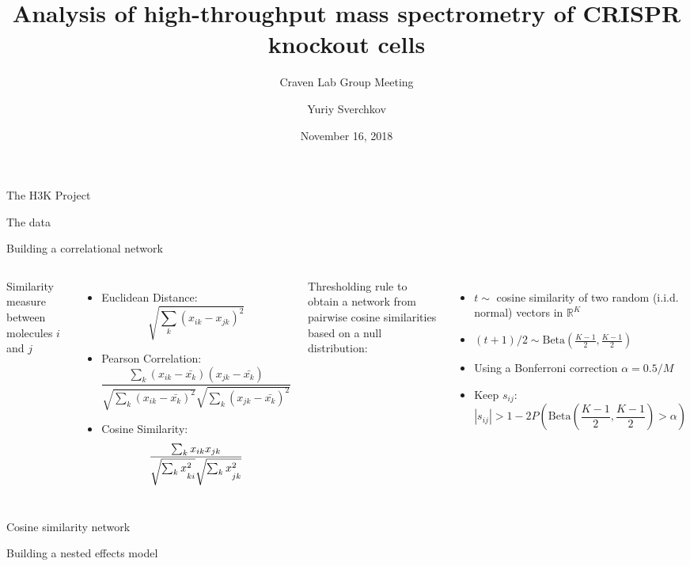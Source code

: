 \documentclass[aspectratio=169]{beamer}
\title{Analysis of high-throughput mass spectrometry of CRISPR knockout cells}
\subtitle{Craven Lab Group Meeting}
\author{Yuriy Sverchkov}
\institute{University of Wisconsin--Madison}
\date{November 16, 2018}
\begin{document}
  {
    \begin{frame}[plain]
      \titlepage
    \end{frame}
  }


\begin{frame}{The H3K Project}
\end{frame}


\begin{frame}{The data}
\end{frame}


\begin{frame}{Building a correlational network}
\begin{columns}
	 \small
	Similarity measure between molecules $i$ and $j$
	\begin{itemize}
		\item Euclidean Distance:
		\[
		\sqrt{ \sum_{k} (x_{ik} - x_{jk})^2 }
		\]\pause
		\item Pearson Correlation:
		\[
		\frac{\sum_k ( x_{ik} - \bar{x_k} ) ( x_{jk} - \bar{ x_k } ) }{ \sqrt{ \sum_k ( x_{ik} - \bar{x_k} )^2 } \sqrt{ \sum_k ( x_{jk} - \bar{ x_k } )^2 } }
		\]\pause
		\item Cosine Similarity:
		\[
		\frac{\sum_k x_{ik} x_{jk}}{ \sqrt{ \sum_k x_{ki\strut}^2 } \sqrt{ \sum_k x_{jk\strut}^2 } }
		\]\pause
	\end{itemize}
	 \small
	Thresholding rule to obtain a network from pairwise cosine similarities based on a null distribution:
	\pause
	
	\begin{itemize}
	\item $t \sim$ cosine similarity of two random (i.i.d. normal) vectors in $\mathbb R^K$
	\item $(t + 1)/2 \sim \mathrm{Beta}( \frac{K - 1}{2}, \frac{K - 1}{2} )$ \pause
	\item Using a Bonferroni correction $\alpha = 0.5/M$
	\item Keep $s_{ij}:$
	\[ | s_{ij} | > 1 - 2 P\left( \mathrm{Beta}\left( \frac{K - 1}{2}, \frac{K - 1}{2} \right) > \alpha \right) \]
	\end{itemize}
\end{columns}
\end{frame}


\begin{frame}{Cosine similarity network}
\end{frame}


\begin{frame}{Building a nested effects model}
\end{frame}
\end{document}
